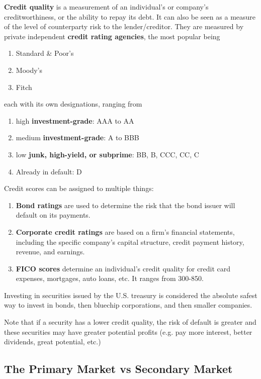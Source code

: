 \documentclass{article}
\begin{document}
  \begin{definition}
    \textbf{Credit quality} is a measurement of an individual's or company's creditworthiness, or the ability to repay its debt. It can also be seen as a measure of the level of counterparty risk to the lender/creditor. They are measured by private independent \textbf{credit rating agencies}, the most popular being
    \begin{enumerate}
      \item Standard \& Poor's 
      \item Moody's 
      \item Fitch
    \end{enumerate}
    each with its own designations, ranging from 
    \begin{enumerate}
      \item high \textbf{investment-grade}: AAA to AA
      \item medium \textbf{investment-grade}: A to BBB
      \item low \textbf{junk, high-yield, or subprime}: BB, B, CCC, CC, C
      \item Already in default: D 
    \end{enumerate}
    Credit scores can be assigned to multiple things:
    \begin{enumerate}
      \item \textbf{Bond ratings} are used to determine the risk that the bond issuer will default on its payments. 
      \item \textbf{Corporate credit ratings} are based on a firm's financial statements, including the specific company's capital structure, credit payment history, revenue, and earnings.
      \item \textbf{FICO scores} determine an individual's credit quality for credit card expenses, mortgages, auto loans, etc. It ranges from 300-850. 
    \end{enumerate}
    Investing in securities issued by the U.S. treasury is considered the absolute safest way to invest in bonds, then bluechip corporations, and then smaller companies. 
  \end{definition}

  Note that if a security has a lower credit quality, the risk of default is greater and these securities may have greater potential profits (e.g. pay more interest, better dividends, great potential, etc.) 

  \subsection{The Primary Market vs Secondary Market}
\end{document}
